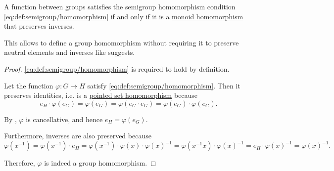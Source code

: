 \begin{proposition}\label{thm:group_homomorphism_single_condition}
  A function between groups satisfies the semigroup homomorphism condition \eqref{eq:def:semigroup/homomorphism} if and only if it is a \hyperref[def:monoid/homomorphism]{monoid homomorphism} that preserves inverses.
\end{proposition}
\begin{comments}
  \item This allows to define a group homomorphism without requiring it to preserve neutral elements and inverses like  suggests.
\end{comments}
\begin{proof}
  \SufficiencySubProof \eqref{eq:def:semigroup/homomorphism} is required to hold by definition.

  \NecessitySubProof Let the function \( \varphi: G \to H \) satisfy \eqref{eq:def:semigroup/homomorphism}. Then it preserves identities, i.e. is a \hyperref[def:pointed_set/homomorphism]{pointed set homomorphism} because
  \begin{equation*}
    e_H \cdot \varphi(e_G) = \varphi(e_G) = \varphi(e_G \cdot e_G) = \varphi(e_G) \cdot \varphi(e_G).
  \end{equation*}

  By , \( \varphi \) is cancellative, and hence \( e_H = \varphi(e_G) \).

  Furthermore, inverses are also preserved because
  \begin{equation*}
    \varphi(x^{-1})
    =
    \varphi(x^{-1}) \cdot e_H
    =
    \varphi(x^{-1}) \cdot \varphi(x) \cdot \varphi(x)^{-1}
    =
    \varphi(x^{-1} x) \cdot \varphi(x)^{-1}
    =
    e_H \cdot \varphi(x)^{-1}
    =
    \varphi(x)^{-1}.
  \end{equation*}

  Therefore, \( \varphi \) is indeed a group homomorphism.
\end{proof}

